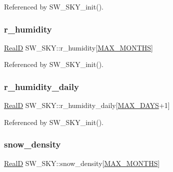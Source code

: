 Referenced by S\+W\+\_\+\+S\+K\+Y\+\_\+init().

\mbox{\label{struct_s_w___s_k_y_a83efc4f0d50703fb68cba8499d06ad23}} 
\subsubsection{\texorpdfstring{r\+\_\+humidity}{r\_humidity}}
{\footnotesize\ttfamily \hyperlink{generic_8h_af1c105fd5732f70b91ddaeda0cc340e3}{RealD} S\+W\+\_\+\+S\+K\+Y\+::r\+\_\+humidity\mbox{[}\hyperlink{_times_8h_a9c97e6841188b672e984a4eba7479277}{M\+A\+X\+\_\+\+M\+O\+N\+T\+HS}\mbox{]}}



Referenced by S\+W\+\_\+\+S\+K\+Y\+\_\+init().

\mbox{\label{struct_s_w___s_k_y_a5abbc167044f7218819f1ab24c8efd9a}} 
\subsubsection{\texorpdfstring{r\+\_\+humidity\+\_\+daily}{r\_humidity\_daily}}
{\footnotesize\ttfamily \hyperlink{generic_8h_af1c105fd5732f70b91ddaeda0cc340e3}{RealD} S\+W\+\_\+\+S\+K\+Y\+::r\+\_\+humidity\+\_\+daily\mbox{[}\hyperlink{_times_8h_a01f08d46080872b9f4284873b7f9dee4}{M\+A\+X\+\_\+\+D\+A\+YS}+1\mbox{]}}



Referenced by S\+W\+\_\+\+S\+K\+Y\+\_\+init().

\mbox{\label{struct_s_w___s_k_y_a89810fdf277f73bd5775cf8eadab4e41}} 
\subsubsection{\texorpdfstring{snow\+\_\+density}{snow\_density}}
{\footnotesize\ttfamily \hyperlink{generic_8h_af1c105fd5732f70b91ddaeda0cc340e3}{RealD} S\+W\+\_\+\+S\+K\+Y\+::snow\+\_\+density\mbox{[}\hyperlink{_times_8h_a9c97e6841188b672e984a4eba7479277}{M\+A\+X\+\_\+\+M\+O\+N\+T\+HS}\mbox{]}}



